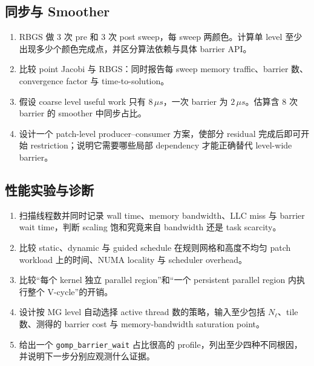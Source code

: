 \subsection*{同步与 Smoother}
\begin{enumerate}[label=\arabic*.]
\item RBGS 做 3 次 pre 和 3 次 post sweep，每 sweep 两颜色。计算单 level 至少出现多少个颜色完成点，并区分算法依赖与具体 barrier API。
\item 比较 point Jacobi 与 RBGS：同时报告每 sweep memory traffic、barrier 数、convergence factor 与 time-to-solution。
\item 假设 coarse level useful work 只有 $8\,\mu s$，一次 barrier 为 $2\,\mu s$。估算含 8 次 barrier 的 smoother 中同步占比。
\item 设计一个 patch-level producer--consumer 方案，使部分 residual 完成后即可开始 restriction；说明它需要哪些局部 dependency 才能正确替代 level-wide barrier。
\end{enumerate}

\subsection*{性能实验与诊断}
\begin{enumerate}[label=\arabic*.]
\item 扫描线程数并同时记录 wall time、memory bandwidth、LLC miss 与 barrier wait time，判断 scaling 饱和究竟来自 bandwidth 还是 task scarcity。
\item 比较 static、dynamic 与 guided schedule 在规则网格和高度不均匀 patch workload 上的时间、NUMA locality 与 scheduler overhead。
\item 比较“每个 kernel 独立 parallel region”和“一个 persistent parallel region 内执行整个 V-cycle”的开销。
\item 设计按 MG level 自动选择 active thread 数的策略，输入至少包括 $N_\ell$、tile 数、测得的 barrier cost 与 memory-bandwidth saturation point。
\item 给出一个 \texttt{gomp\_barrier\_wait} 占比很高的 profile，列出至少四种不同根因，并说明下一步分别应观测什么证据。
\end{enumerate}
